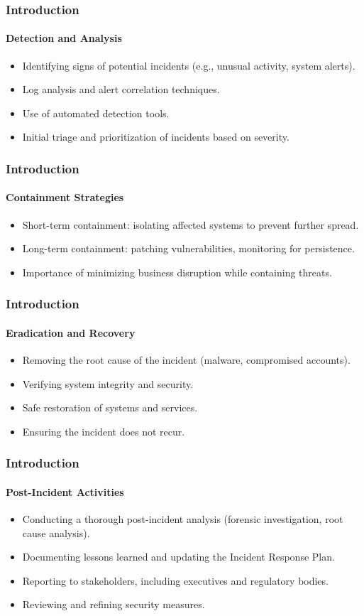 \begin{frame}
	\frametitle{Introduction}
	\framesubtitle{Detection and Analysis}
	\begin{itemize}
		\item Identifying signs of potential incidents (e.g., unusual activity, system alerts).
   		\item Log analysis and alert correlation techniques.
   		\item Use of automated detection tools.
  		\item Initial triage and prioritization of incidents based on severity.
	\end{itemize}
\end{frame}

\begin{frame}
	\frametitle{Introduction}
	\framesubtitle{Containment Strategies}
	\begin{itemize} 
    		\item Short-term containment: isolating affected systems to prevent further spread.
    		\item Long-term containment: patching vulnerabilities, monitoring for persistence.
    		\item Importance of minimizing business disruption while containing threats.
	\end{itemize}
\end{frame}

\begin{frame}
	\frametitle{Introduction}
	\framesubtitle{Eradication and Recovery}
	\begin{itemize}
    	 	\item Removing the root cause of the incident (malware, compromised accounts).
    		\item Verifying system integrity and security.
     		\item Safe restoration of systems and services.
    		\item Ensuring the incident does not recur.
	\end{itemize}
\end{frame}

\begin{frame}
	\frametitle{Introduction}
	\framesubtitle{Post-Incident Activities}
	\begin{itemize}
    		\item Conducting a thorough post-incident analysis (forensic investigation, root cause analysis).
    		\item Documenting lessons learned and updating the Incident Response Plan.
    		\item Reporting to stakeholders, including executives and regulatory bodies.
    		\item Reviewing and refining security measures.
	\end{itemize}
\end{frame}

